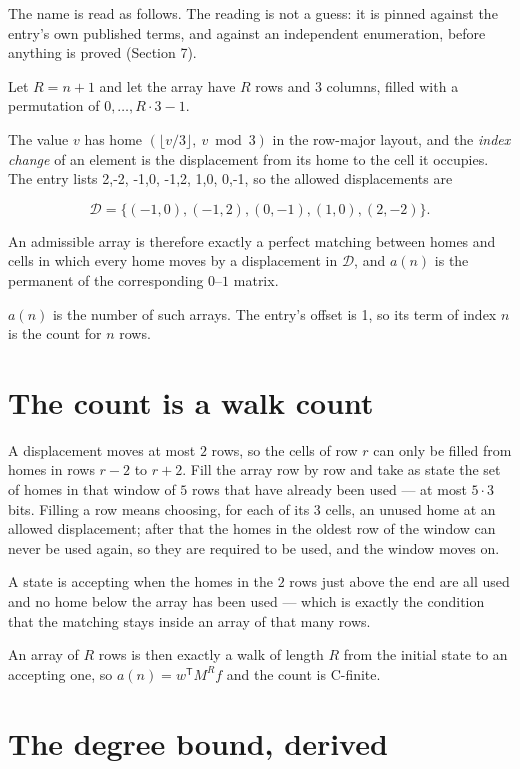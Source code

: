 \documentclass[11pt]{article}
\theoremstyle{definition}
\begin{document}
The name is read as follows. The reading is not a guess: it is pinned against the entry's own published terms, and against an independent enumeration, before anything is proved (Section 7).

Let $R = n + 1$ and let the array have $R$ rows and $3$ columns, filled with a permutation of $0,\dots,R\cdot3-1$.

The value $v$ has home $(\lfloor v/3\rfloor,\ v \bmod 3)$ in the row-major layout, and the {\itshape index change} of an element is the displacement from its home to the cell it occupies. The entry lists 2,-2, -1,0, -1,2, 1,0, 0,-1, so the allowed displacements are

\[\mathcal{D} = \{(-1,0), (-1,2), (0,-1), (1,0), (2,-2)\}.\]

An admissible array is therefore exactly a perfect matching between homes and cells in which every home moves by a displacement in $\mathcal{D}$, and $a(n)$ is the permanent of the corresponding $0$--$1$ matrix.

$a(n)$ is the number of such arrays. The entry's offset is 1, so its term of index $n$ is the count for $n$ rows.

\section{The count is a walk count}

A displacement moves at most $2$ rows, so the cells of row $r$ can only be filled from homes in rows $r-2$ to $r+2$. Fill the array row by row and take as state the set of homes in that window of $5$ rows that have already been used --- at most $5\cdot3$ bits. Filling a row means choosing, for each of its $3$ cells, an unused home at an allowed displacement; after that the homes in the oldest row of the window can never be used again, so they are required to be used, and the window moves on.

A state is accepting when the homes in the $2$ rows just above the end are all used and no home below the array has been used --- which is exactly the condition that the matching stays inside an array of that many rows.

An array of $R$ rows is then exactly a walk of length $R$ from the initial state to an accepting one, so $a(n) = w^{\mathsf T}M^{R}f$ and the count is C-finite.

\section{The degree bound, derived}
\end{document}
